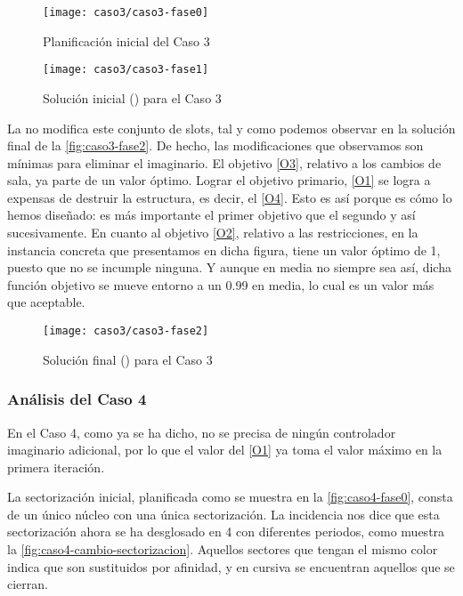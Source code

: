 \begin{figure}
	\centering
	\texttt{[image: caso3/caso3-fase0]}
	\caption{Planificación inicial del Caso 3}
	\label{fig:caso3-fase0}
\end{figure}

\begin{figure}
	\centering
	\texttt{[image: caso3/caso3-fase1]}
	\caption{Solución inicial (\faseuno{}) para el Caso 3}
	\label{fig:caso3-fase1}
\end{figure}

La \fasedos{} no modifica este conjunto de slots, tal y como podemos observar en la solución final de la \autoref{fig:caso3-fase2}. De hecho, las modificaciones que observamos son mínimas para eliminar el imaginario. El objetivo \ref{O3}, relativo a los cambios de sala, ya parte de un valor óptimo. Lograr el objetivo primario, \ref{O1} se logra a expensas de destruir la estructura, es decir, el \ref{O4}. Esto es así porque es cómo lo hemos diseñado: es más importante el primer objetivo que el segundo y así sucesivamente. En cuanto al objetivo \ref{O2}, relativo a las restricciones, en la instancia concreta que presentamos en dicha figura, tiene un valor óptimo de 1, puesto que no se incumple ninguna. Y aunque en media no siempre sea así, dicha función objetivo se mueve entorno a un 0.99 en media, lo cual es un valor más que aceptable.

\begin{figure}[!h]
	\centering
	\texttt{[image: caso3/caso3-fase2]}
	\caption{Solución final (\fasedos{}) para el Caso 3}
	\label{fig:caso3-fase2}
\end{figure}

\subsubsection{Análisis del Caso 4}

En el Caso 4, como ya se ha dicho, no se precisa de ningún controlador imaginario adicional, por lo que el valor del \ref{O1} ya toma el valor máximo en la primera iteración.

La sectorización inicial, planificada como se muestra en la \autoref{fig:caso4-fase0}, consta de un único núcleo con una única sectorización. La incidencia nos dice que esta sectorización ahora se ha desglosado en 4 con diferentes periodos, como muestra la \autoref{fig:caso4-cambio-sectorizacion}. Aquellos sectores que tengan el mismo color indica que son sustituidos por afinidad, y en cursiva se encuentran aquellos que se cierran.

